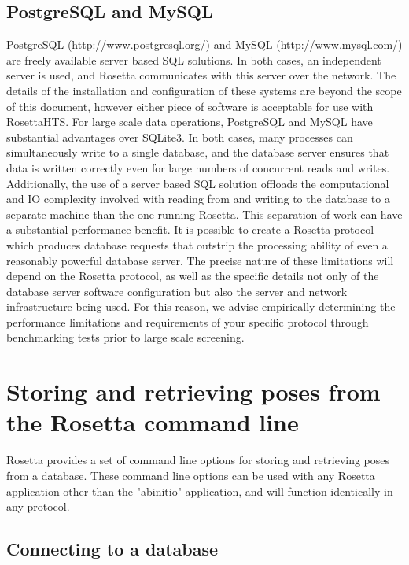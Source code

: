 \subsection{PostgreSQL and MySQL}

PostgreSQL (http://www.postgresql.org/) and MySQL (http://www.mysql.com/) are freely available server based SQL solutions.
In both cases, an independent server is used, and Rosetta communicates with this server over the network.
The details of the installation and configuration of these systems are beyond the scope of this document, however either piece of software is acceptable for use with RosettaHTS. 
For large scale data operations, PostgreSQL and MySQL have substantial advantages over SQLite3. 
In both cases, many processes can simultaneously write to a single database, and the database server ensures that data is written correctly even for large numbers of concurrent reads and writes.
Additionally, the use of a server based SQL solution offloads the computational and IO complexity involved with reading from and writing to the database to a separate machine than the one running Rosetta.
This separation of work can have a substantial performance benefit.
It is possible to create a Rosetta protocol which produces database requests that outstrip the processing ability of even a reasonably powerful database server.
The precise nature of these limitations will depend on the Rosetta protocol, as well as the specific details not only of the database server software configuration but also the server and network infrastructure being used.
For this reason, we advise empirically determining the performance limitations and requirements of your specific protocol through benchmarking tests prior to large scale screening. 

\section{Storing and retrieving poses from the Rosetta command line}

Rosetta provides a set of command line options for storing and retrieving poses from a database.
These command line options can be used with any Rosetta application other than the "abinitio" application, and will function identically in any protocol.

\subsection{Connecting to a database}


